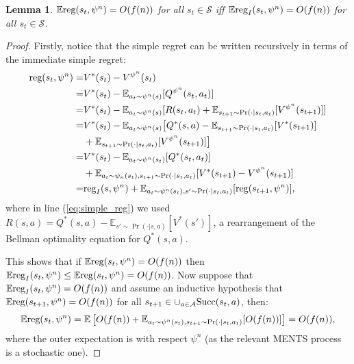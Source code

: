 \documentclass{article}
\newcommand{\bb}[1]{\mathbb{#1}}
\newcommand{\cl}[1]{\mathcal{#1}}
\newcommand{\suc}[1]{\cup_{a\in\cl{A}}\textnormal{Succ}(#1,a)}
\newcommand{\reg}{\textnormal{reg}}
\theoremstyle{plain}
\newtheorem{lemma}[theorem]{Lemma}
\begin{document}
\begin{appendices}
    
        \begin{lemma} \label{lem:imm_simple_regret}
            $\bb{E}\reg(s_t,\psi^n)=O(f(n))$ for all $s_t\in\cl{S}$ iff $\bb{E}\reg_I(s_t,\psi^n)=O(f(n))$ for all $s_t\in\cl{S}$.
        \end{lemma}
        \begin{proof}
            Firstly, notice that the simple regret can be written recursively in terms of the immediate simple regret:
            \begin{align}
                \reg(s_t,\psi^n) =& V^*(s_t) - V^{\psi^n}(s_t) \\
                    =& V^*(s_t) - \bb{E}_{a_t\sim\psi^n(s)}[Q^{\psi^n}(s_t,a_t)] \\
                    =& V^*(s_t) - \bb{E}_{a_t\sim\psi^n(s)}[R(s_t,a_t) +    
                        \bb{E}_{s_{t+1}\sim\Pr(\cdot|s_t,a_t)}[V^{\psi^n}(s_{t+1})]] \\
                    =& V^*(s_t) - \bb{E}_{a_t\sim\psi^n(s)}\big[Q^*(s,a) - 
                        \bb{E}_{s_{t+1}\sim\Pr(\cdot|s_t,a_t)}[V^*(s_{t+1})]  \notag \\
                        &+ \bb{E}_{s_{t+1}\sim\Pr(\cdot|s_t,a_t)}[V^{\psi^n}(s_{t+1})]\big] \label{eq:simple_reg} \\
                    =& V^*(s_t) - \bb{E}_{a_t\sim\psi^n(s_t)}[Q^*(s_t,a_t)] \notag \\
                        &+ \bb{E}_{a_t\sim\psi_n(s_t),s_{t+1}\sim\Pr(\cdot|s_t,a_t)}[
                            V^*(s_{t+1}) - V^{\psi^n}(s_{t+1})] \\
                    =& \reg_I(s,\psi^n) + 
                        \bb{E}_{a_t\sim\psi^n(s_t),s'\sim\Pr(\cdot|s_t,a_t)}[\reg(s_{t+1},\psi^n)], \label{eq:regret_relation}
            \end{align}
            where in line (\ref{eq:simple_reg}) we used $R(s,a) = Q^*(s,a) - \bb{E}_{s'\sim\Pr(\cdot|s,a)}[V^*(s')]$, a rearrangement of the Bellman optimality equation for $Q^*(s,a)$.
            
            This shows that if $\bb{E}\reg(s_t,\psi^n)=O(f(n))$ then $\bb{E}\reg_I(s_t,\psi^n)\leq \bb{E}\reg(s_t,\psi^n) = O(f(n))$. Now suppose that $\bb{E}\reg_I(s_t,\psi^n)=O(f(n))$ and assume an inductive hypothesis that $\bb{E}\reg(s_{t+1},\psi^n)=O(f(n))$ for all $s_{t+1}\in\suc{s_t}$, then:
            \begin{align}
                \bb{E}\reg(s_t,\psi^n) = \bb{E}\left[ O(f(n)) + \bb{E}_{a_t\sim\psi^n(s_t),s_{t+1}\sim\Pr(\cdot|s_t,a_t)}[O(f(n))] \right] = O(f(n)),
            \end{align}
            where the outer expectation is with respect $\psi^n$ (as the relevant MENTS process is a stochastic one).
        \end{proof}






\end{appendices}
\end{document}
